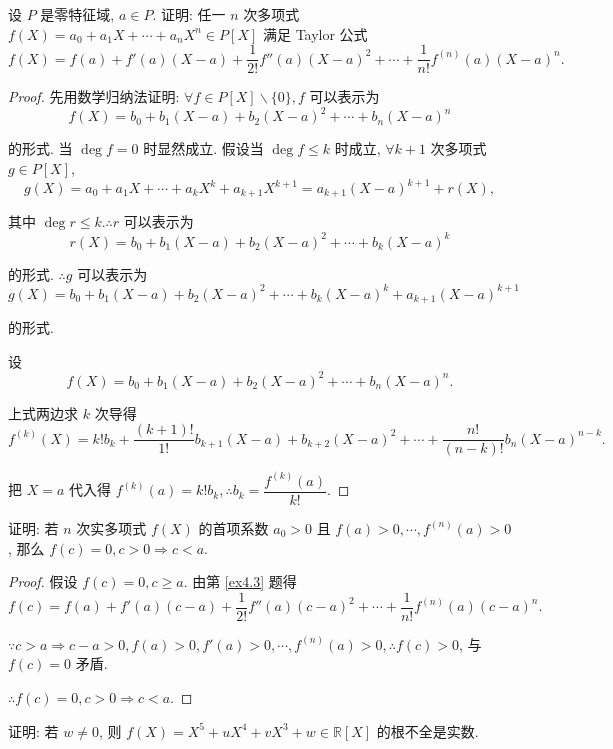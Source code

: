 \documentclass[UTF8]{ctexart}
\begin{document}
\begin{exercise}\label{ex4.3}
    设 $P$ 是零特征域, $a\in P$. 证明: 任一 $n$ 次多项式 $f(X)=a_0+a_1X+\cdots+a_nX^n\in P[X]$ 满足 Taylor 公式
    \[f(X)=f(a)+f'(a)(X-a)+\dfrac{1}{2!}f''(a)(X-a)^2+\cdots+\dfrac{1}{n!}f^{(n)}(a)(X-a)^n.\]
\end{exercise}
\begin{proof}
    先用数学归纳法证明: $\forall f\in P[X]\backslash\{0\},f$ 可以表示为
    \[f(X)=b_0+b_1(X-a)+b_2(X-a)^2+\cdots+b_n(X-a)^n\]

    的形式. 当 $\deg f=0$ 时显然成立. 假设当 $\deg f\leq k$ 时成立, $\forall k+1$ 次多项式 $g\in P[X]$,
    \[g(X)=a_0+a_1X+\cdots+a_kX^k+a_{k+1}X^{k+1}=a_{k+1}(X-a)^{k+1}+r(X),\]

    其中 $\deg r\leq k.\therefore r$ 可以表示为
    \[r(X)=b_0+b_1(X-a)+b_2(X-a)^2+\cdots+b_k(X-a)^k\]

    的形式. $\therefore g$ 可以表示为
    \[g(X)=b_0+b_1(X-a)+b_2(X-a)^2+\cdots+b_k(X-a)^k+a_{k+1}(X-a)^{k+1}\]

    的形式.

    设
    \[f(X)=b_0+b_1(X-a)+b_2(X-a)^2+\cdots+b_n(X-a)^n.\]

    上式两边求 $k$ 次导得
    \[f^{(k)}(X)=k!b_k+\dfrac{(k+1)!}{1!}b_{k+1}(X-a)+b_{k+2}(X-a)^2+\cdots+\dfrac{n!}{(n-k)!}b_n(X-a)^{n-k}.\]
    
    把 $X=a$ 代入得 $f^{(k)}(a)=k!b_k,\therefore b_k=\dfrac{f^{(k)}(a)}{k!}$.
\end{proof}
\begin{exercise}%
    证明: 若 $n$ 次实多项式 $f(X)$ 的首项系数 $a_0>0$ 且 $f(a)>0,\cdots,f^{(n)}(a)>0$, 那么 $f(c)=0,c>0\Rightarrow c<a$.
\end{exercise}
\begin{proof}
    假设 $f(c)=0,c\geq a$. 由第 \ref{ex4.3} 题得
    \[f(c)=f(a)+f'(a)(c-a)+\dfrac{1}{2!}f''(a)(c-a)^2+\cdots+\dfrac{1}{n!}f^{(n)}(a)(c-a)^n.\]

    $\because c>a\Rightarrow c-a>0,f(a)>0,f'(a)>0,\cdots,f^{(n)}(a)>0,\therefore f(c)>0$, 与 $f(c)=0$ 矛盾.

    $\therefore f(c)=0,c>0\Rightarrow c<a$.
\end{proof}
\begin{exercise}%
    证明: 若 $w\neq0$, 则 $f(X)=X^5+uX^4+vX^3+w\in\mathbb{R}[X]$ 的根不全是实数.
\end{exercise}
\end{document}
